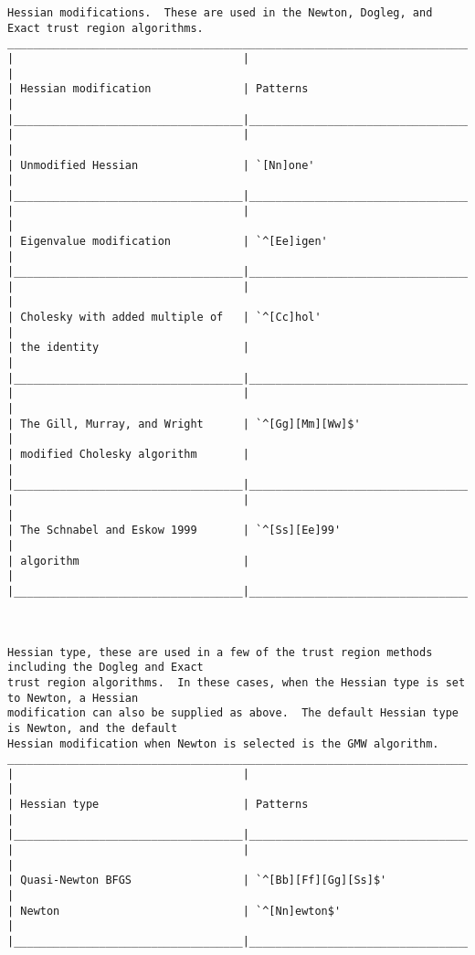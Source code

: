 {\begin{verbatim}
Hessian modifications.  These are used in the Newton, Dogleg, and Exact trust region algorithms.
___________________________________________________________________________________________
|                                   |                                                     |
| Hessian modification              | Patterns                                            |
|___________________________________|_____________________________________________________|
|                                   |                                                     |
| Unmodified Hessian                | `[Nn]one'                                           |
|___________________________________|_____________________________________________________|
|                                   |                                                     |
| Eigenvalue modification           | `^[Ee]igen'                                         |
|___________________________________|_____________________________________________________|
|                                   |                                                     |
| Cholesky with added multiple of   | `^[Cc]hol'                                          |
| the identity                      |                                                     |
|___________________________________|_____________________________________________________|
|                                   |                                                     |
| The Gill, Murray, and Wright      | `^[Gg][Mm][Ww]$'                                    |
| modified Cholesky algorithm       |                                                     |
|___________________________________|_____________________________________________________|
|                                   |                                                     |
| The Schnabel and Eskow 1999       | `^[Ss][Ee]99'                                       |
| algorithm                         |                                                     |
|___________________________________|_____________________________________________________|



Hessian type, these are used in a few of the trust region methods including the Dogleg and Exact
trust region algorithms.  In these cases, when the Hessian type is set to Newton, a Hessian
modification can also be supplied as above.  The default Hessian type is Newton, and the default
Hessian modification when Newton is selected is the GMW algorithm.
___________________________________________________________________________________________
|                                   |                                                     |
| Hessian type                      | Patterns                                            |
|___________________________________|_____________________________________________________|
|                                   |                                                     |
| Quasi-Newton BFGS                 | `^[Bb][Ff][Gg][Ss]$'                                |
| Newton                            | `^[Nn]ewton$'                                       |
|___________________________________|_____________________________________________________|



\end{verbatim}}

